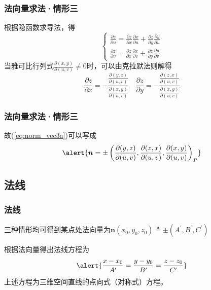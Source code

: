 \begin{frame}
    \frametitle{法向量求法·情形三}

    根据隐函数求导法，得\pause
    \begin{equation}
        \begin{cases}
            \frac{\partial z}{\partial u}=\frac{\partial z}{\partial x}\frac{\partial x}{\partial u}+\frac{\partial z}{\partial y}\frac{\partial y}{\partial u}\\
            \frac{\partial z}{\partial v}=\frac{\partial z}{\partial x}\frac{\partial x}{\partial v}+\frac{\partial z}{\partial y}\frac{\partial y}{\partial v}
        \end{cases}\label{eq:hid_func_der}
    \end{equation}\pause
    当雅可比行列式$\displaystyle\frac{\partial(x,y)}{\partial(u,v)}\neq 0$时，可以由克拉默法则解得\pause
    \begin{equation}
        \frac{\partial z}{\partial x}=-\frac{\frac{\partial(y,z)}{\partial(u,v)}}{\frac{\partial(x,y)}{\partial(u,v)}}%
        \quad%
        \frac{\partial z}{\partial y}=-\frac{\frac{\partial(z,x)}{\partial(u,v)}}{\frac{\partial(x,y)}{\partial(u,v)}}
        \label{eq:hid_func_der_sol}
    \end{equation}

\end{frame}

\begin{frame}
    \frametitle{法向量求法·情形三}

    故(\ref{eq:norm_vec3a})可以写成\pause
    \begin{equation}
        \alert{\boldsymbol{n}=\pm\left(\frac{\partial(y,z)}{\partial(u,v)},\frac{\partial(z,x)}{\partial(u,v)},\frac{\partial(x,y)}{\partial(u,v)}\right)_P}\label{eq:norm_vec3b}
    \end{equation}

\end{frame}

\subsection{法线}
\begin{frame}
    \frametitle{法线}

    三种情形均可得到某点处法向量为$\boldsymbol{n}(x_0,y_0,z_0)\triangleq\pm(A^\prime,B^\prime,C^\prime)$\pause

    根据法向量得出法线方程为\pause
    \begin{equation}
        \alert{\frac{x-x_0}{A^\prime}=\frac{y-y_0}{B^\prime}=\frac{z-z_0}{C^\prime}}%
        \label{eq:normal_line}
    \end{equation}\pause
    上述方程为三维空间直线的点向式（对称式）方程。

\end{frame}

